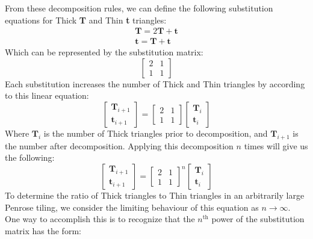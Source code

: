 \documentclass[
  oneside,
  11pt, a4paper,
  footinclude=true,
  headinclude=true,
  cleardoublepage=empty
]{scrbook}
\begin{document}
From these decomposition rules, we can define the following substitution equations for Thick \textbf{T} and Thin \textbf{t} triangles:
\begin{equation}
\begin{split}
\textbf{T}=2\textbf{T}+\textbf{t}\\
\textbf{t}=\textbf{T}+\textbf{t}
\end{split}
\end{equation}
Which can be represented by the substitution matrix:
\begin{equation}
\begin{bmatrix}
2 & 1 \\
1 & 1
\end{bmatrix}
\end{equation}
Each substitution increases the number of Thick and Thin triangles by according to this linear equation: 
\begin{equation}
\begin{bmatrix}
\textbf{T}_{i+1} \\
\textbf{t}_{i+1}
\end{bmatrix}=
\begin{bmatrix}
2 & 1 \\
1 & 1
\end{bmatrix}
\begin{bmatrix}
\textbf{T}_{i} \\
\textbf{t}_{i}
\end{bmatrix}
\end{equation}
Where $\textbf{T}_{i}$ is the number of Thick triangles prior to decomposition, and $\textbf{T}_{i+1}$ is the number after decomposition. Applying this decomposition $n$ times will give us the following:
\begin{equation}
\begin{bmatrix}
\textbf{T}_{i+1} \\
\textbf{t}_{i+1}
\end{bmatrix}=
\begin{bmatrix}
2 & 1 \\
1 & 1
\end{bmatrix}^n
\begin{bmatrix}
\textbf{T}_{i} \\
\textbf{t}_{i}
\end{bmatrix}
\label{eq:subeq}
\end{equation}
To determine the ratio of Thick triangles to Thin triangles in an arbitrarily large Penrose tiling, we consider the limiting behaviour of this equation as $n\rightarrow\infty$. One way to accomplish this is to recognize that the $n^{\text{th}}$ power of the substitution matrix has the form:
\end{document}
